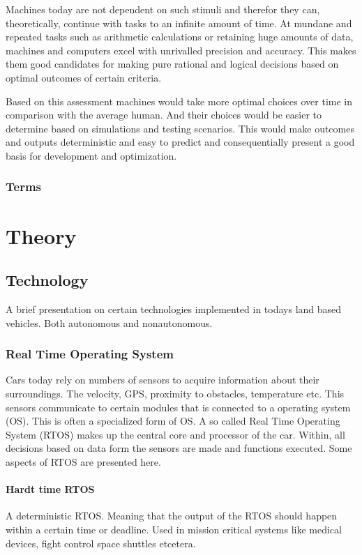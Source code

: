 \documentclass[conference]{IEEEtran}
\begin{document}
		 Machines today are not dependent on such stimuli and therefor they can, theoretically, continue with tasks to an
		 infinite amount of time. At mundane and repeated tasks such as arithmetic calculations or retaining huge amounts of data,
		 machines and computers excel with unrivalled precision and accuracy. This makes them good candidates for making
		 pure rational and logical decisions based on optimal outcomes of certain criteria.

		 Based on this assessment machines would take more optimal choices over time in comparison with the average human.
		 And their choices would be easier to determine based on simulations and testing scenarios.
		 This would make outcomes and outputs deterministic and easy to predict and consequentially present a good
		 basis for development and optimization.

	 \subsubsection{Terms}

\section{Theory}
 \subsection{Technology}
	 A brief presentation on certain technologies implemented in todays land based vehicles. Both autonomous
	 and nonautonomous.
	 \subsubsection{Real Time Operating System}
		 Cars today rely on numbers of sensors to acquire information about their surroundings.
		 The velocity, GPS, proximity to obstacles, temperature etc. This sensors communicate to certain
		 modules that is connected to a operating system (OS). This is often a specialized form
		 of OS. A so called Real Time Operating System (RTOS) makes up the central core and processor
		 of the car. Within, all decisions based on data form the sensors are made and functions
		 executed. Some aspects of RTOS are presented here.

		 \paragraph{Hardt time RTOS}
		 A deterministic RTOS. Meaning that the output of the RTOS should happen within a certain
		 time or deadline. Used in mission critical systems like medical devices, fight control
		 space shuttles etcetera.
\end{document}
